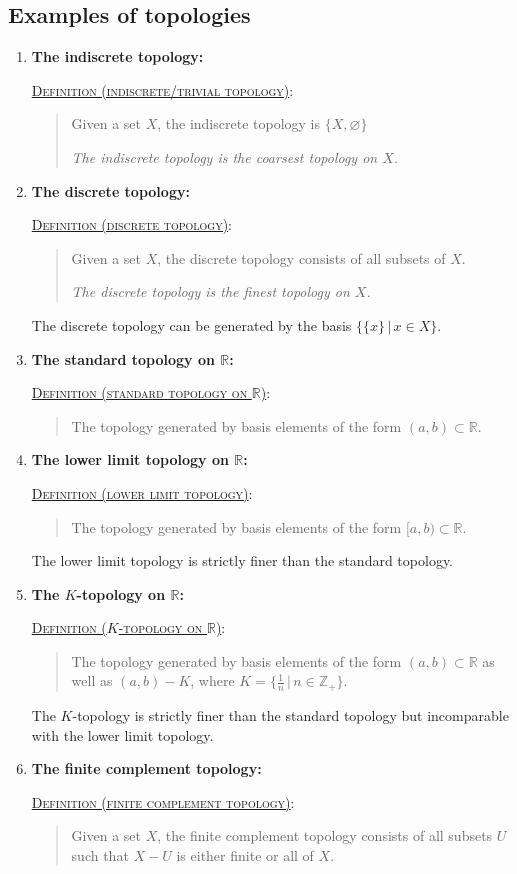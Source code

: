 \documentclass[letterpaper, 12pt]{article}
\newcommand{\RR}{\mathbb{R}}
\newcommand{\ZZ}{\mathbb{Z}}
\newcommand{\defn}[2]{\textsc{\underline{Definition (#1)}:}\begin{quote} #2\end{quote}}
\let\emptyset\varnothing
\begin{document}
    \subsection{Examples of topologies}
        \begin{enumerate}[resume]
        \item \textbf{The indiscrete topology:}

            \defn{indiscrete/trivial topology}{Given a set $X$, the indiscrete topology is $\{X, \emptyset\}$

            \textit{The indiscrete topology is the coarsest topology on $X$.}}
        \item \textbf{The discrete topology:}

            \defn{discrete topology}{Given a set $X$, the discrete topology consists of all subsets of $X$.

            \textit{The discrete topology is the finest topology on $X$.}}

            The discrete topology can be generated by the basis $\{\{x\}\,|\,x\in X\}$.
        \item \textbf{The standard topology on $\RR$:}

            \defn{standard topology on $\RR$}{The topology generated by basis elements of the form $(a, b) \subset\RR$.}
        \item \textbf{The lower limit topology on $\RR$:}

            \defn{lower limit topology}{The topology generated by basis elements of the form $[a, b)\subset\RR$.}

            The lower limit topology is strictly finer than the standard topology.
        \item \textbf{The $K$-topology on $\RR$:}

            \defn{$K$-topology on $\RR$}{The topology generated by basis elements of the form $(a, b)\subset\RR$ as well as $(a, b) - K$, where $K = \{\tfrac{1}{n}\,|\,n\in\ZZ_+\}$.}

            The $K$-topology is strictly finer than the standard topology but incomparable with the lower limit topology.
        \item \textbf{The finite complement topology:}

            \defn{finite complement topology}{Given a set $X$, the finite complement topology consists of all subsets $U$ such that $X-U$ is either finite or all of $X$.}
        \end{enumerate}
\end{document}
